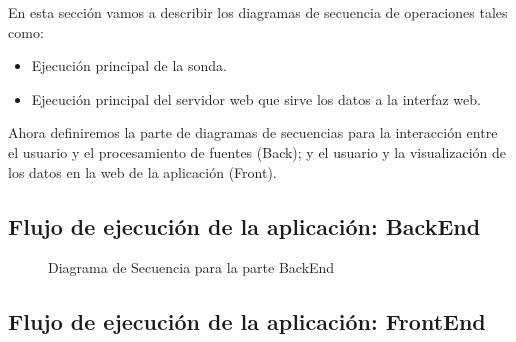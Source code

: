 En esta sección vamos a describir los diagramas de secuencia de operaciones tales como:

\begin{itemize}
\item Ejecución principal de la sonda.
\item Ejecución principal del servidor web que sirve los datos a la interfaz web.
\end{itemize}

Ahora definiremos la parte de diagramas de secuencias para la interacción entre el usuario y el procesamiento de fuentes (Back); y el usuario y la visualización de los datos en la web de la aplicación (Front).\\
\newpage

\subsection{Flujo de ejecución de la aplicación: BackEnd}
\begin{figure}[H]
\caption{Diagrama de Secuencia para la parte BackEnd}
\end{figure}

\subsection{Flujo de ejecución de la aplicación: FrontEnd}

